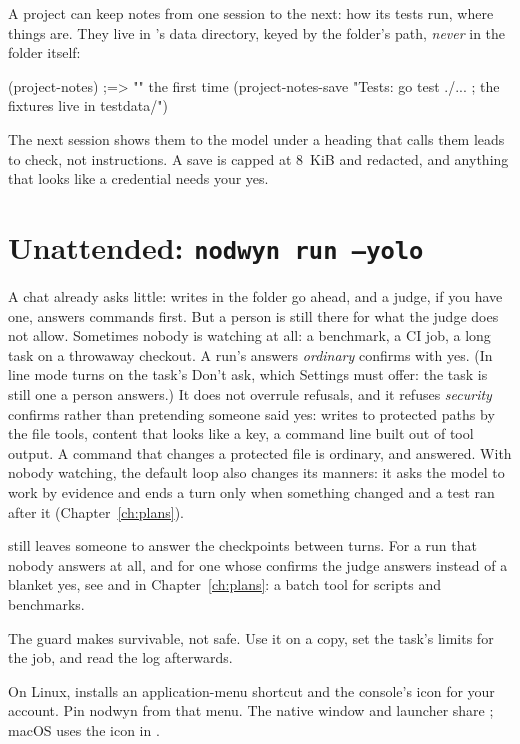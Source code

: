 A project can keep notes from one session to the next: how its tests run,
where things are. They live in \nodwyn's data directory, keyed by the
folder's path, \emph{never} in the folder itself:

\begin{scm}
(project-notes)                         ;=> "" the first time
(project-notes-save "Tests: go test ./... ; the fixtures live in testdata/")
\end{scm}

The next session shows them to the model under a heading that calls them
leads to check, not instructions. A save is capped at 8~KiB and redacted,
and anything that looks like a credential needs your yes.

\section{Unattended: \texttt{nodwyn run --yolo}}

A chat already asks little: writes in the folder go ahead, and a judge, if
you have one, answers commands first. But a person is still there for what
the judge does not allow. Sometimes nobody is watching at all: a
benchmark, a CI job, a long task on a throwaway checkout. A run's
 answers \emph{ordinary} confirms with yes. (In line mode
 turns on the task's Don't ask, which Settings must offer:
the task is still one a person answers.)
It does not overrule refusals, and it refuses \emph{security} confirms
rather than pretending someone said yes: writes to protected paths by the
file tools, content that looks like a key, a command line built out of tool
output. A command that changes a protected file is ordinary, and answered. With nobody
watching, the default loop also changes its manners: it asks the model to
work by evidence and ends a turn only when something changed and a test ran
after it (Chapter~\ref{ch:plans}).

 still leaves someone to answer the checkpoints between
turns. For a run that nobody answers at
all, and for one whose confirms the judge answers instead of a blanket yes,
see  and  in
Chapter~\ref{ch:plans}: a batch tool for scripts and benchmarks.

\begin{careful}
The guard makes  survivable, not safe. Use it on a copy, set
the task's limits for the job, and read the log afterwards.
\end{careful}

On Linux, 
installs an application-menu shortcut and the console's icon for your
account. Pin nodwyn from that menu. The native window and launcher share
; macOS uses the icon in .
